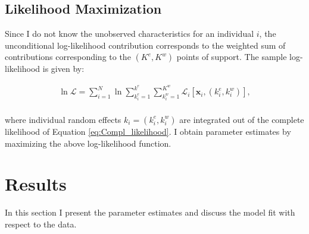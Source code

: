 \documentclass[12pt, a4paper]{article}
\let\Oldsection\section
\renewcommand{\section}{\FloatBarrier\Oldsection}
\let\Oldsubsection\subsection
\renewcommand{\subsection}{\FloatBarrier\Oldsubsection}
\begin{document}
%

\subsection{Likelihood Maximization}\label{Sec:maximization}

Since I do not know the unobserved characteristics for an individual $i$, the unconditional log-likelihood contribution corresponds to the weighted sum of contributions corresponding to the $(K^{e},K^{w})$ points of support. The sample log-likelihood is given by:

\begin{align}\label{eq:Compl_likelihood}
\ln \mathcal{L} = \sum_{i=1}^{N} \ln \sum_{k_i^e=1}^{k^e} \sum_{k_i^w=1}^{K^w} \mathcal{L}_{i}[\textbf{x}_i, (k_i^{e},k_i^{w})], 	\\ \nonumber
\end{align}

where individual random effects $k_i = (k_i^e,k_i^w)$ are integrated out of the complete likelihood of Equation \eqref{eq:Compl_likelihood}. I obtain parameter estimates by maximizing the above log-likelihood function.

\section{Results}

In this section I present the parameter estimates and discuss the model fit with respect to the data.
\end{document}
